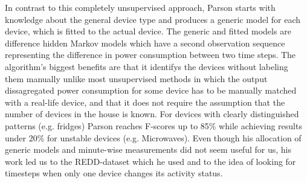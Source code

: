 \documentclass{article}
\begin{document}
In contrast to this completely unsupervised approach, Parson starts with knowledge about the general device type and 
produces a generic model for each device, which is fitted to the actual device. The generic and fitted models are difference hidden Markov models which have a second observation sequence representing the difference in power consumption between two time steps. The algorithm's biggest benefits are that it identifys the 
devices without labeling them manually unlike most unsupervised methods in which the output dissagregated power consumption for some device has to be manually matched with a real-life device, and that it does not require the assumption that the number of devices in the house is known. For devices with clearly distinguished patterns 
(e.g. fridges) Parson reaches F-scores up to 85\% while achieving results under 20\% for unstable devices (e.g. Microwaves).
Even though his allocation of generic models and minute-wise measurements did not seem useful for us, his work led 
us to the REDD-dataset which he used
and to the idea of looking for timesteps when only one device changes its activity status.




\end{document}
